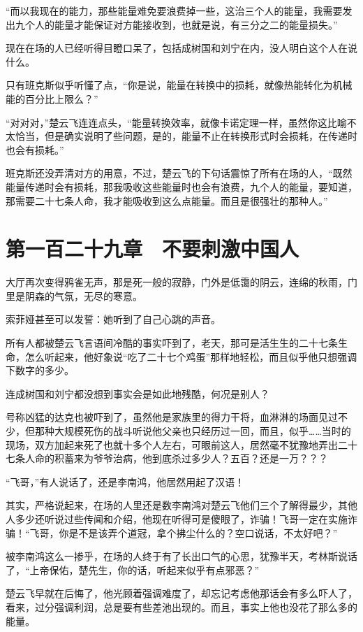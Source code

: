 “而以我现在的能力，那些能量难免要浪费掉一些，这治三个人的能量，我需要发出九个人的能量才能保证对方能接收到，也就是说，有三分之二的能量损失。”

现在在场的人已经听得目瞪口呆了，包括成树国和刘宁在内，没人明白这个人在说什么。

只有班克斯似乎听懂了点，“你是说，能量在转换中的损耗，就像热能转化为机械能的百分比上限么？”

“对对对，”楚云飞连连点头，“能量转换效率，就像卡诺定理一样，虽然你这比喻不太恰当，但是确实说明了些问题，是的，能量不止在转换形式时会损耗，在传递时也会有损耗。”

班克斯还没弄清对方的用意，不过，楚云飞的下句话震惊了所有在场的人，“既然能量传递时会有损耗，那我吸收这些能量时也会有浪费，九个人的能量，要知道，那需要二十七条人命，我才能吸收到这么点能量。而且是很强壮的那种人。”

\section{第一百二十九章　不要刺激中国人}

大厅再次变得鸦雀无声，那是死一般的寂静，门外是低霭的阴云，连绵的秋雨，门里是阴森的气氛，无尽的寒意。

索菲娅甚至可以发誓：她听到了自己心跳的声音。

所有人都被楚云飞言语间冷酷的事实吓到了，老天，那可是活生生的二十七条生命，怎么听起来，他好象说“吃了二十七个鸡蛋”那样地轻松，而且似乎他只想强调下数字的多少。

连成树国和刘宁都没想到事实会是如此地残酷，何况是别人？

号称凶猛的达克也被吓到了，虽然他是家族里的得力干将，血淋淋的场面见过不少，但那种大规模死伤的战斗听说他父亲也只经历过一回，而且，似乎……当时的现场，双方加起来死了也就十多个人左右，可眼前这人，居然毫不犹豫地弄出二十七条人命的积蓄来为爷爷治病，他到底杀过多少人？五百？还是一万？？？

“飞哥，”有人说话了，还是李南鸿，他居然用起了汉语！

其实，严格说起来，在场的人里还是数李南鸿对楚云飞他们三个了解得最少，其他人多少还听说过些传闻和介绍，他现在听得可是傻眼了，诈骗！飞哥一定在实施诈骗！“飞哥，你是不是该弄个道冠，拿个拂尘什么的？空口说话，不太好吧？”

被李南鸿这么一掺乎，在场的人终于有了长出口气的心思，犹豫半天，考林斯说话了，“上帝保佑，楚先生，你的话，听起来似乎有点邪恶？”

楚云飞早就在后悔了，他光顾着强调难度了，却忘记考虑他那话会有多么吓人了，看来，过分强调利润，总是要有些差池出现的。而且，事实上他也没花了那么多的能量。

